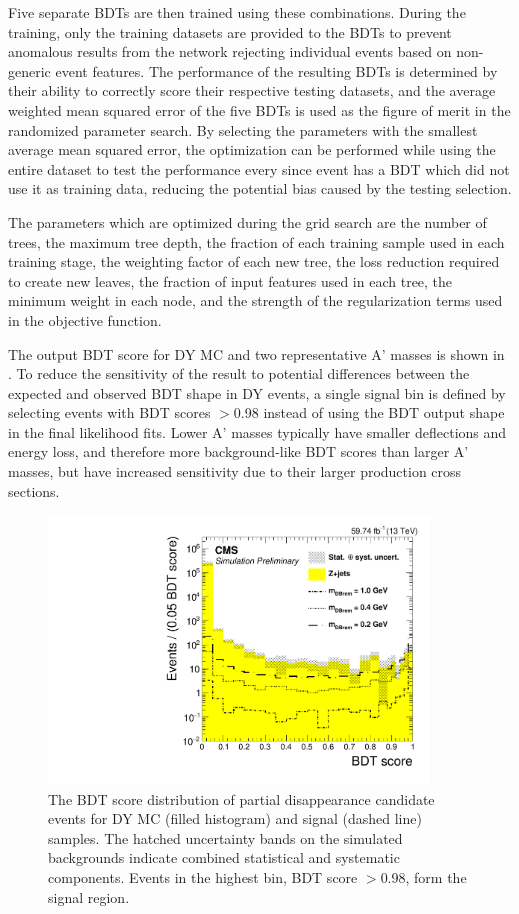 Five separate BDTs are then trained using these combinations.
During the training, only the training datasets are provided to the BDTs to prevent anomalous results from the network rejecting individual events based on non-generic event features.
The performance of the resulting BDTs is determined by their ability to correctly score their respective testing datasets, and the average weighted mean squared error of the five BDTs is used as the figure of merit in the randomized parameter search.
By selecting the parameters with the smallest average mean squared error, the optimization can be performed while using the entire dataset to test the performance every since event has a BDT which did not use it as training data, reducing the potential bias caused by the testing selection.

The parameters which are optimized during the grid search are the number of trees, the maximum tree depth, the fraction of each training sample used in each training stage, the weighting factor of each new tree, the loss reduction required to create new leaves, the fraction of input features used in each tree, the minimum weight in each node, and the strength of the regularization terms used in the objective function.

The output BDT score for DY MC and two representative A' masses is shown in . 
To reduce the sensitivity of the result to potential differences between the expected and observed BDT shape in DY events, a single signal bin is defined by selecting events with BDT scores $>$0.98 instead of using the BDT output shape in the final likelihood fits.
Lower A' masses typically have smaller deflections and energy loss, and therefore more background-like BDT scores than larger A' masses, but have increased sensitivity due to their larger \dbrem production cross sections.

\begin{figure}[htbp]
	\centering
	\includegraphics[width=0.9\textwidth]{figures/BDTscore_DYandSignal.pdf}
	\caption[Partial Disappearance BDT Output for DY and Signal]{The BDT score distribution of partial disappearance candidate events for DY MC (filled histogram) and signal (dashed line) samples. The hatched uncertainty bands on the simulated backgrounds indicate combined statistical and systematic components. Events in the highest bin, BDT score $>$0.98, form the signal region.}
        \label{fig:BDToutput}
\end{figure}

